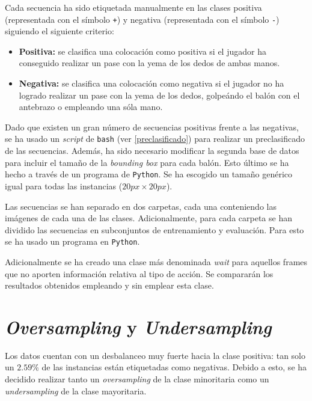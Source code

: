 \documentclass[12pt]{report} %
\begin{document}
    Cada secuencia ha sido etiquetada manualmente en las clases positiva
    (representada con el símbolo \verb!+!) y negativa (representada con el
    símbolo \verb!-!) siguiendo el siguiente criterio:
    \begin{itemize}
        \item \textbf{Positiva:} se clasifica una colocación como positiva si
        el jugador ha conseguido realizar un pase con la yema de los dedos de
        ambas manos.
        \item \textbf{Negativa:} se clasifica una colocación como negativa si
        el jugador no ha logrado realizar un pase con la yema de los dedos,
        golpeándo el balón con el antebrazo o empleando una sóla mano.
    \end{itemize}
    
    Dado que existen un gran número de secuencias positivas frente a las
    negativas, se ha usado un \textit{script} de \texttt{bash} (ver
    \ref{preclasificado}) para realizar un preclasificado de las secuencias.
    Además, ha sido necesario modificar la segunda base de datos para incluir
    el tamaño de la \textit{bounding box} para cada balón. Esto último se ha
    hecho a través de un programa de \texttt{Python}. Se ha escogido un 
    tamaño genérico igual para todas las instancias ($20px\times20px$).

    Las secuencias se han separado en dos carpetas, cada una conteniendo las
    imágenes de cada una de las clases. Adicionalmente, para cada carpeta se
    han dividido las secuencias en subconjuntos de entrenamiento y evaluación.
    Para esto se ha usado un programa en \texttt{Python}.

    Adicionalmente se ha creado una clase más denominada \textit{wait} para
    aquellos frames que no aporten información relativa al tipo de acción. Se
    compararán los resultados obtenidos empleando y sin emplear esta clase.

    \section{\textit{Oversampling} y \textit{Undersampling}}

    Los datos cuentan con un desbalanceo muy fuerte hacia la clase positiva: tan
    solo un $2.59\%$ de las instancias están etiquetadas como negativas. Debido
    a esto, se ha decidido realizar tanto un \textit{oversampling} de la clase
    minoritaria como un \textit{undersampling} de la clase mayoritaria. 
\end{document}
